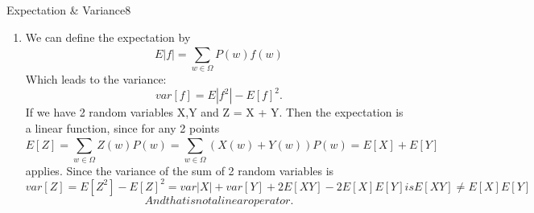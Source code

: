 \begin{questions}
	
	\begin{question}{Expectation \& Variance}{8}		
	\begin{answer} 
			\begin{enumerate}
		\item We can define the expectation by \begin{equation}
 E \vert f \vert =    \sum\limits_{w \in\Omega }^{ }  P(w) f(w) 
\end{equation}
Which leads to the variance:
\begin{equation}
 var\left[ f \right] = E\left\lvert f^2 \right\rvert - E \left[ f \right]^2.
\end{equation}
If we have 2 random variables X,Y and Z = X + Y. 
Then the expectation is a linear function, since for any 2 points 
\begin{equation}
E\left[ Z \right] = \sum\limits_{w \in\Omega }^{ }  Z(w) P(w)  = \sum\limits_{w \in\Omega }^{ } (X(w)+ Y(w))P(w) = E\left[ X \right] + E\left[ Y \right]
\end{equation}
applies. Since the variance of the sum of 2 random variables is 
\begin{equation}
var\left[ Z \right] = E\left[ Z^2 \right] - E\left[ Z \right]^2 = var\left\lvert X \right\rvert + var\left[ Y \right] + 2E\left[ XY \right] - 2E\left[ X \right]E\left[ Y \right] is E\left[ XY \right] \neq E\left[ X \right] E\left[ Y \right] 
\end{equation}
\begin{equation}
And that is not a linear operator.
\end{equation}


\end{enumerate}
\end{answer}
\end{question}
\end{questions}
